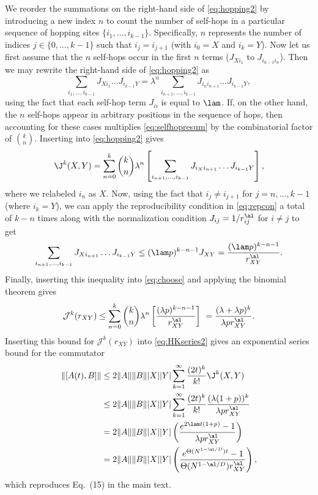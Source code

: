 We reorder the summations on the right-hand side of \cref{eq:hopping2} by introducing a new index $n$ to count the number of self-hops in a particular sequence of hopping sites $\{i_1,\dots,i_{k-1}\}$.
Specifically, $n$ represents the number of indices $j\in\{0,\dots,k-1\}$ such that $i_{j}=i_{j+1}$ (with $i_{0}=X$ and $i_{k}=Y$).
Now let us first assume that the $n$ self-hops occur in the first $n$ terms ($J_{Xi_1}$ to $J_{i_{n-1}i_{n}}$). Then we may rewrite the right-hand side of \cref{eq:hopping2} as
%
\begin{equation}
\label{eq:selfhopresum}
\sum_{i_{1},\dots,i_{k-1}}J_{Xi_{1}}\dots J_{i_{k-1}Y}
= \lambda^n \sum_{i_{n+1},\dots,i_{k-1}}J_{i_{n}i_{n+1}}\dots J_{i_{k-1}Y},
\end{equation}
%
using the fact that each self-hop term $J_{ii}$ is equal to $\lam$.
If, on the other hand, the $n$ self-hops appear in arbitrary positions in the sequence of hops, then accounting for these cases multiplies \cref{eq:selfhopresum} by the combinatorial factor of $\binom k n$.
Inserting into \cref{eq:hopping2} gives
%
\begin{align}
	\label{eq:choose}
	\J^k(X,Y) = \sum_{n=0}^{k}{\binom k n}\lambda^{n} \left[\sum_{i_{n+1},\dots,i_{k-1}}J_{i_Xi_{n+1}}\dots J_{i_{k-1}Y} \right],
\end{align}
where we relabeled $i_n$ as $X$.
Now, using the fact that $i_{j}\neq i_{j+1}$ for $j=n,\dots,k-1$ (where $i_k=Y$), we can apply the reproducibility condition in \cref{eq:repcon} a total of $k-n$ times along with the normalization condition $J_{ij} = 1/r_{ij}^{\al}$ for $i\neq j$ to get
%
\begin{align}
	\sum_{i_{n+1},\dots,i_{k-1}}J_{Xi_{n+1}}\dots J_{i_{k-1}Y} \le (\lam p)^{k-n-1} J_{XY} = \frac{(\lam p)^{k-n-1}}{r_{XY}^{\al}}.
\end{align}
%
Finally, inserting this inequality into \cref{eq:choose} and applying the binomial theorem gives
\begin{equation}
\mathcal{J}^{k}(r_{XY}) \le \sum_{n=0}^{k}{\binom k n}\lambda^{n}\left[\frac{(\lambda p)^{k-n-1}}{r_{XY}^{\al}}\right]\ = \frac{(\lambda+\lambda p)^{k}}{\lambda pr_{XY}^{\al}}.
\end{equation}
Inserting this bound for $\mathcal{J}^{k}(r_{XY})$ into \cref{eq:HKseries2} gives an exponential series bound for the commutator
\begin{align}
	\|[A(t),B]\| &\le 2\|A\|\|B\||X||Y|\sum_{k=1}^{\infty}\frac{(2t)^{k}}{k!} \J^k(X,Y) \\
    &\le 2\|A\|\|B\||X||Y|\sum_{k=1}^{\infty}\frac{(2t)^{k}}{k!} \frac{(\lambda(1+p))^{k}}{\lambda pr_{XY}^{\al}}\\
    &= 2\|A\|\|B\||X||Y| \left(\frac{e^{2\lam t(1+p)}-1}{\lambda pr_{XY}^{\al}}\right) \\
    &= 2\|A\|\|B\||X||Y|\left(\frac{e^{\Theta(N^{1-\al/D})t}-1}{\Theta(N^{1-\al/D})r_{XY}^\al}\right), \label{eq:newbound2}
\end{align}
which reproduces Eq.~(15) in the main text.


